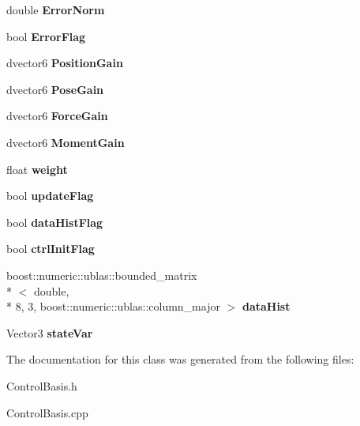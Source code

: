 \begin{DoxyCompactItemize}
\item 
\hypertarget{classControlBasis_ad441a8e9af6bacd22b114aa8a7750cc2}{double {\bfseries Error\-Norm}}\label{classControlBasis_ad441a8e9af6bacd22b114aa8a7750cc2}

\item 
\hypertarget{classControlBasis_aa86ca210409b371e963ed733614b20c2}{bool {\bfseries Error\-Flag}}\label{classControlBasis_aa86ca210409b371e963ed733614b20c2}

\item 
\hypertarget{classControlBasis_a7069be504f105f92a36ab86bd68dd4fe}{dvector6 {\bfseries Position\-Gain}}\label{classControlBasis_a7069be504f105f92a36ab86bd68dd4fe}

\item 
\hypertarget{classControlBasis_a102d1d4caa813447cd5eaac72cd60818}{dvector6 {\bfseries Pose\-Gain}}\label{classControlBasis_a102d1d4caa813447cd5eaac72cd60818}

\item 
\hypertarget{classControlBasis_a471a072305d781ca81f5990877337a7f}{dvector6 {\bfseries Force\-Gain}}\label{classControlBasis_a471a072305d781ca81f5990877337a7f}

\item 
\hypertarget{classControlBasis_a74e1f06ab2834706dbc5bd66b94fc87d}{dvector6 {\bfseries Moment\-Gain}}\label{classControlBasis_a74e1f06ab2834706dbc5bd66b94fc87d}

\item 
\hypertarget{classControlBasis_a4239330ae9d14bfb86ffdf89274f064a}{float {\bfseries weight}}\label{classControlBasis_a4239330ae9d14bfb86ffdf89274f064a}

\item 
\hypertarget{classControlBasis_a0b245638ffd46f24b8d34693cfc24fac}{bool {\bfseries update\-Flag}}\label{classControlBasis_a0b245638ffd46f24b8d34693cfc24fac}

\item 
\hypertarget{classControlBasis_a3dd7f5ae4c05d80dd3a1a47f7afdc750}{bool {\bfseries data\-Hist\-Flag}}\label{classControlBasis_a3dd7f5ae4c05d80dd3a1a47f7afdc750}

\item 
\hypertarget{classControlBasis_a7fa31b86b3d8da78ceebb7619990daef}{bool {\bfseries ctrl\-Init\-Flag}}\label{classControlBasis_a7fa31b86b3d8da78ceebb7619990daef}

\item 
\hypertarget{classControlBasis_a447040ff1d28aefa669efee3c4a41858}{boost\-::numeric\-::ublas\-::bounded\-\_\-matrix\\*
$<$ double, \\*
8, 3, boost\-::numeric\-::ublas\-::column\-\_\-major $>$ {\bfseries data\-Hist}}\label{classControlBasis_a447040ff1d28aefa669efee3c4a41858}

\item 
\hypertarget{classControlBasis_a4c93468e8059c42f860a507f041abc15}{Vector3 {\bfseries state\-Var}}\label{classControlBasis_a4c93468e8059c42f860a507f041abc15}

\end{DoxyCompactItemize}


The documentation for this class was generated from the following files\-:\begin{DoxyCompactItemize}
\item 
Control\-Basis.\-h\item 
Control\-Basis.\-cpp\end{DoxyCompactItemize}
